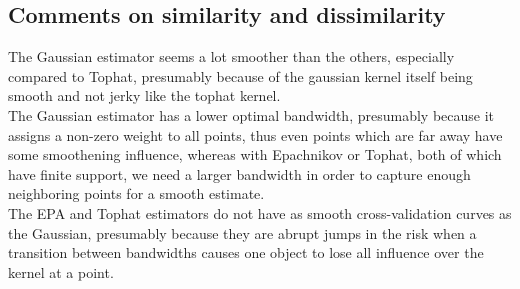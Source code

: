 \subsection{Comments on similarity and dissimilarity}
 The Gaussian estimator seems a lot smoother than the others, especially compared to Tophat, presumably because of the gaussian kernel itself being smooth and not jerky like the tophat kernel.\\
 The Gaussian estimator has a lower optimal bandwidth, presumably because it assigns a non-zero weight to all points, thus even points which are far away have some smoothening influence, whereas with Epachnikov or Tophat, both of which have finite support, we need a larger bandwidth in order to capture enough neighboring points for a smooth estimate.\\
 The EPA and Tophat estimators do not have as smooth cross-validation curves as the Gaussian, presumably because they are abrupt jumps in the risk when a transition between bandwidths causes one object to lose all influence over the kernel at a point.
\newpage